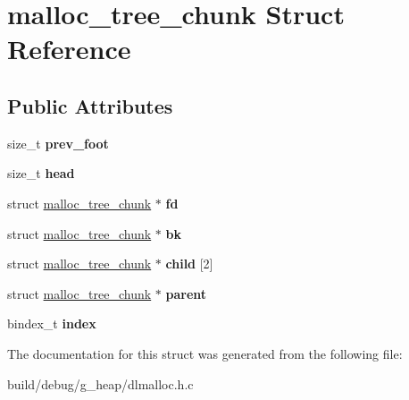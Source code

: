 \hypertarget{structmalloc__tree__chunk}{\section{malloc\-\_\-tree\-\_\-chunk Struct Reference}
\label{structmalloc__tree__chunk}
}
\subsection*{Public Attributes}
\begin{DoxyCompactItemize}
\item 
\hypertarget{structmalloc__tree__chunk_a0b7e321702857b18f5013a3182b99262}{size\-\_\-t {\bfseries prev\-\_\-foot}}\label{structmalloc__tree__chunk_a0b7e321702857b18f5013a3182b99262}

\item 
\hypertarget{structmalloc__tree__chunk_a1737b1a78f4bfbf0047210e3f3fd014d}{size\-\_\-t {\bfseries head}}\label{structmalloc__tree__chunk_a1737b1a78f4bfbf0047210e3f3fd014d}

\item 
\hypertarget{structmalloc__tree__chunk_a1616615a8f3b241b94e6f81c16fd588f}{struct \hyperlink{structmalloc__tree__chunk}{malloc\-\_\-tree\-\_\-chunk} $\ast$ {\bfseries fd}}\label{structmalloc__tree__chunk_a1616615a8f3b241b94e6f81c16fd588f}

\item 
\hypertarget{structmalloc__tree__chunk_a323667954b77b044c768da183735e30c}{struct \hyperlink{structmalloc__tree__chunk}{malloc\-\_\-tree\-\_\-chunk} $\ast$ {\bfseries bk}}\label{structmalloc__tree__chunk_a323667954b77b044c768da183735e30c}

\item 
\hypertarget{structmalloc__tree__chunk_a8ffc314e7affb2c64d17d9628ba61ad2}{struct \hyperlink{structmalloc__tree__chunk}{malloc\-\_\-tree\-\_\-chunk} $\ast$ {\bfseries child} \mbox{[}2\mbox{]}}\label{structmalloc__tree__chunk_a8ffc314e7affb2c64d17d9628ba61ad2}

\item 
\hypertarget{structmalloc__tree__chunk_a50c10fc1bc1e781ddb9be910b930b8c8}{struct \hyperlink{structmalloc__tree__chunk}{malloc\-\_\-tree\-\_\-chunk} $\ast$ {\bfseries parent}}\label{structmalloc__tree__chunk_a50c10fc1bc1e781ddb9be910b930b8c8}

\item 
\hypertarget{structmalloc__tree__chunk_a3015f2a8d6cc5cdb7abaf34e902c46a4}{bindex\-\_\-t {\bfseries index}}\label{structmalloc__tree__chunk_a3015f2a8d6cc5cdb7abaf34e902c46a4}

\end{DoxyCompactItemize}


The documentation for this struct was generated from the following file\-:\begin{DoxyCompactItemize}
\item 
build/debug/g\-\_\-heap/dlmalloc.\-h.\-c\end{DoxyCompactItemize}
